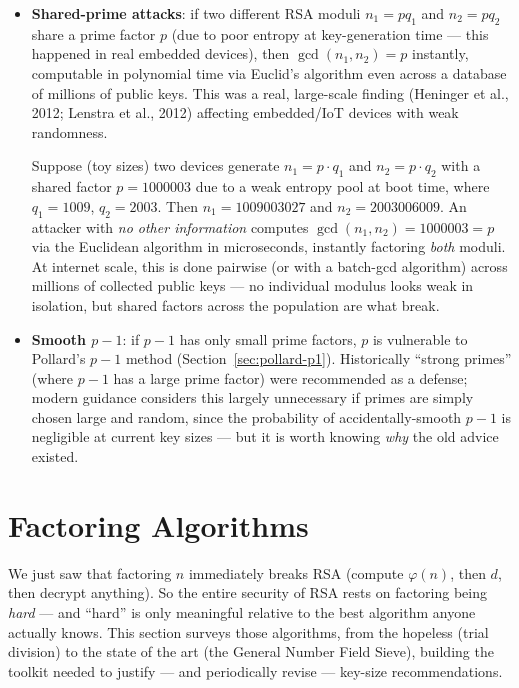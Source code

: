 \begin{itemize}
\item \textbf{Shared-prime attacks}: if two different RSA moduli $n_1 = p q_1$ and $n_2 = p q_2$ share a prime factor $p$ (due to poor entropy at key-generation time — this happened in real embedded devices), then $\gcd(n_1, n_2) = p$ instantly, computable in polynomial time via Euclid's algorithm even across a database of millions of public keys. This was a real, large-scale finding (Heninger et al., 2012; Lenstra et al., 2012) affecting embedded/IoT devices with weak randomness.

\begin{example}
Suppose (toy sizes) two devices generate $n_1 = p \cdot q_1$ and $n_2 = p \cdot q_2$ with a shared factor $p = 1000003$ due to a weak entropy pool at boot time, where $q_1 = 1009$, $q_2 = 2003$. Then $n_1 = 1009003027$ and $n_2 = 2003006009$. An attacker with \emph{no other information} computes $\gcd(n_1, n_2) = 1000003 = p$ via the Euclidean algorithm in microseconds, instantly factoring \emph{both} moduli. At internet scale, this is done pairwise (or with a batch-gcd algorithm) across millions of collected public keys — no individual modulus looks weak in isolation, but shared factors across the population are what break.
\end{example}
\item \textbf{Smooth $p-1$}: if $p - 1$ has only small prime factors, $p$ is vulnerable to Pollard's $p-1$ method (Section~\ref{sec:pollard-p1}). Historically ``strong primes'' (where $p-1$ has a large prime factor) were recommended as a defense; modern guidance considers this largely unnecessary if primes are simply chosen large and random, since the probability of accidentally-smooth $p-1$ is negligible at current key sizes — but it is worth knowing \emph{why} the old advice existed.
\end{itemize}

\newpage
\section{Factoring Algorithms}

We just saw that factoring $n$ immediately breaks RSA (compute $\varphi(n)$, then $d$, then decrypt anything). So the entire security of RSA rests on factoring being \emph{hard} — and ``hard'' is only meaningful relative to the best algorithm anyone actually knows. This section surveys those algorithms, from the hopeless (trial division) to the state of the art (the General Number Field Sieve), building the toolkit needed to justify — and periodically revise — key-size recommendations.

